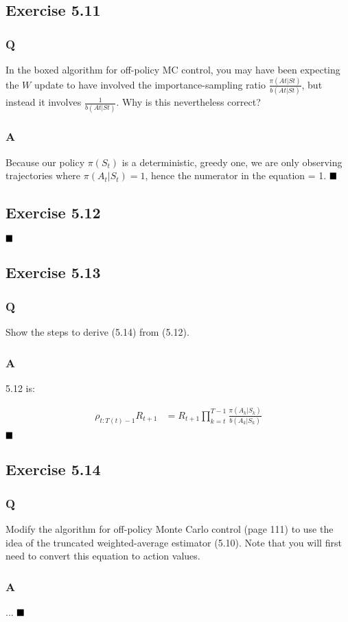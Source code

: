 \subsection{Exercise 5.11}
\subsubsection{Q}
In the boxed algorithm for off-policy MC control, you may have been expecting the $W$ update to have involved the importance-sampling ratio $\frac{\pi (At|St)}{b(At|St)}$, but
instead it involves $\frac{1}{b(At|St)}$. Why is this nevertheless correct?
\subsubsection{A}
Because our policy $\pi(S_t)$ is a deterministic, greedy one, we are only observing trajectories where $\pi(A_t | S_t) = 1$, hence the numerator in the equation = 1.
$
\hfill \blacksquare
$

\subsection{Exercise 5.12}
\ProgrammingExercise
$
\hfill \blacksquare
$

\subsection{Exercise 5.13}
\subsubsection{Q}
Show the steps to derive (5.14) from (5.12). 
\subsubsection{A}
5.12 is:

\begin{align}
\rho_{t:T(t)-1} R_{t+1} &= R_{t+1} \prod_{k = t}^{T-1} \frac{\pi(A_k | S_k)}{b(A_k | S_k)} \\
\end{align}
$
\hfill \blacksquare
$

\subsection{Exercise 5.14}
\subsubsection{Q}
Modify the algorithm for off-policy Monte Carlo control (page 111) to use the idea of the truncated weighted-average estimator (5.10). Note that you will first need to convert this equation to action values.
\subsubsection{A}
...
$
\hfill \blacksquare
$
